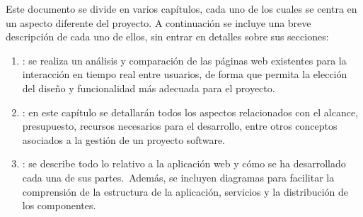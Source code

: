 
Este documento se divide en varios capítulos, cada uno de los cuales se centra en un aspecto diferente del proyecto.
A continuación se incluye una breve descripción de cada uno de ellos, sin entrar en detalles sobre sus secciones:

\begin{enumerate}
	\item {}: se realiza un análisis y comparación de las páginas web existentes para la
	interacción en tiempo real entre usuarios, de forma que permita la elección del diseño y funcionalidad más
	adecuada para el proyecto.
	\item {}: en este capítulo se detallarán todos los aspectos relacionados con
	el alcance, presupuesto, recursos necesarios para el desarrollo, entre otros conceptos asociados a la gestión de un
	proyecto software.
	\item {}: se describe todo lo relativo a la aplicación web y cómo se ha desarrollado cada
	una de sus partes.\ Además, se incluyen diagramas para facilitar la comprensión de la estructura de la aplicación,
	servicios y la distribución de los componentes.
\end{enumerate}
